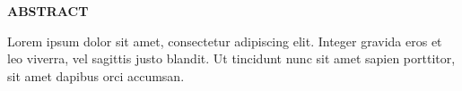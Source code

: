 \thispagestyle{plain}
\begin{flushright}
    \large \textbf{{ABSTRACT}}
\end{flushright}

\vspace{1\baselineskip}

\noindent{}
Lorem ipsum dolor sit amet, consectetur adipiscing elit. Integer gravida eros et leo viverra, vel sagittis justo blandit. Ut tincidunt nunc sit amet sapien porttitor, sit amet dapibus orci accumsan.